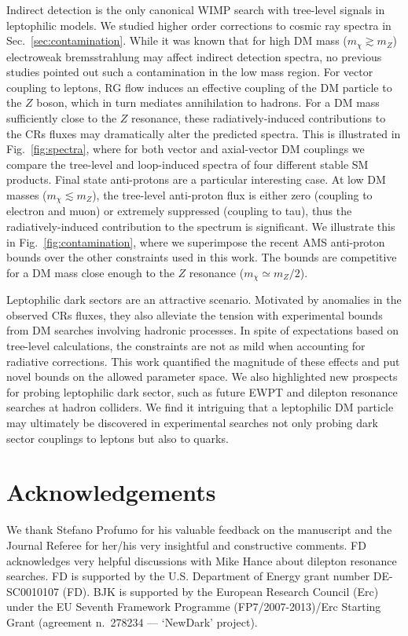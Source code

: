\documentclass[final,5p,twocolumn]{elsarticle}
\begin{document}
Indirect detection is the only canonical WIMP search with tree-level signals in leptophilic models. We studied higher order corrections to cosmic ray spectra in Sec.~\ref{sec:contamination}. While it was known that for high DM mass ($m_\chi \gtrsim m_Z$) electroweak bremsstrahlung may affect indirect detection spectra, no previous studies pointed out such a contamination in the low mass region. For vector coupling to leptons, RG flow induces an effective coupling of the DM particle to the $Z$ boson, which in turn mediates annihilation to hadrons. For a DM mass sufficiently close to the $Z$ resonance, these radiatively-induced contributions to the CRs fluxes may dramatically alter the predicted spectra. This is illustrated in Fig.~\ref{fig:spectra}, where for both vector and axial-vector DM couplings we compare the tree-level and loop-induced spectra of four different stable SM products. Final state anti-protons are a particular interesting case. At low DM masses ($m_\chi \lesssim m_Z$), the tree-level anti-proton flux is either zero (coupling to electron and muon) or extremely suppressed (coupling to tau), thus the radiatively-induced contribution to the spectrum is significant. We illustrate this in Fig.~\ref{fig:contamination}, where we superimpose the recent AMS anti-proton bounds over the other constraints used in this work. The bounds are competitive for a DM mass close enough to the $Z$ resonance ($m_\chi \simeq m_Z/2$).  

Leptophilic dark sectors are an attractive scenario. Motivated by anomalies in the observed CRs fluxes, they also alleviate the tension with experimental bounds from DM searches involving hadronic processes. In spite of expectations based on tree-level calculations, the constraints are not as mild when accounting for radiative corrections. This work quantified the magnitude of these effects and put novel bounds on the allowed parameter space. We also highlighted new prospects for probing leptophilic dark sector, such as future EWPT and dilepton resonance searches at hadron colliders. We find it intriguing that a leptophilic DM particle may ultimately be discovered in experimental searches not only probing dark sector couplings to leptons but also to quarks. 

\section*{Acknowledgements}

We thank Stefano Profumo for his valuable feedback on the manuscript and the Journal Referee for her/his very insightful and constructive comments. FD acknowledges very helpful discussions with Mike Hance  about dilepton resonance searches. FD is supported by the U.S. Department of Energy grant number DE-SC0010107 (FD). BJK is supported by the European Research Council ({\sc Erc}) under the EU Seventh Framework Programme (FP7/2007-2013)/{\sc Erc} Starting Grant (agreement n.\ 278234 --- `{\sc NewDark}' project).
\end{document}
